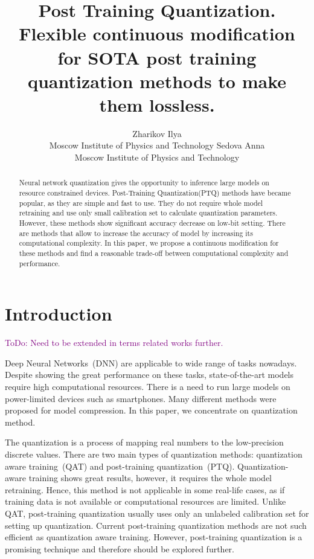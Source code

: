 \documentclass{article}
\title{Post Training Quantization. Flexible continuous modification for SOTA post training quantization methods to make them lossless.}
\author{ Zharikov Ilya \\
        Moscow Institute of Physics and Technology
	\And
	  Sedova Anna \\
	Moscow Institute of Physics and Technology\\
}
\date{}
\newcommand{\TODO}[1]{\textcolor{purple}{ToDo: #1.}}
\begin{document}
\maketitle

\begin{abstract}
Neural network quantization gives the opportunity to inference large models on resource constrained devices. Post-Training Quantization(PTQ) methods have became popular, as they are simple and fast to use. They do not require whole model retraining and use only small calibration set to calculate quantization parameters. However, these methods show significant accuracy decrease on low-bit setting. There are methods that allow to increase the accuracy of model by increasing its computational complexity. In this paper, we propose a continuous modification for these methods and find a reasonable trade-off between computational complexity and performance.
\end{abstract}



\section{Introduction}

\TODO{Need to be extended in terms related works further}

Deep Neural Networks~(DNN) are applicable to wide range of tasks nowadays. Despite showing the great performance on these tasks, state-of-the-art models require high computational resources. There is a need to run large models on power-limited devices such as smartphones. Many different methods were proposed for model compression. In this paper, we concentrate on quantization method.

The quantization is a process of  mapping real numbers to the low-precision discrete values. There are two main types of quantization methods: quantization aware training~(QAT) and post-training quantization~(PTQ). Quantization-aware training shows great results, however, it requires the whole model retraining. Hence, this method is not applicable in some real-life cases, as if training data is not available or computational resources are limited. Unlike QAT, post-training quantization usually uses only an unlabeled calibration set for setting up quantization. Current post-training quantization methods are not such efficient as quantization aware training. However, post-training quantization is a promising technique and therefore should be explored further.
\end{document}

